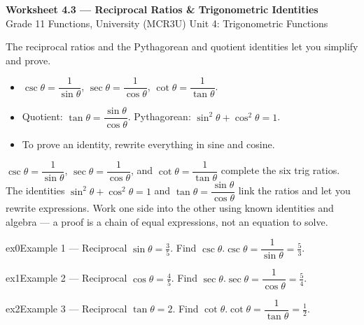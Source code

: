 \documentclass[11pt]{article}
\begin{document}
\begin{center}
{\LARGE\bfseries\color{titleblue}Worksheet 4.3 --- Reciprocal Ratios \& Trigonometric Identities}\\[2pt]
{\small Grade 11 Functions, University (MCR3U) \textperiodcentered{} Unit 4: Trigonometric Functions}
\end{center}

\begin{ideabox}
The reciprocal ratios and the Pythagorean and quotient identities let you simplify and prove.
\begin{itemize}[leftmargin=*,itemsep=2pt]
  \item $\csc\theta=\dfrac{1}{\sin\theta}$, $\sec\theta=\dfrac{1}{\cos\theta}$, $\cot\theta=\dfrac{1}{\tan\theta}$.
  \item Quotient: $\tan\theta=\dfrac{\sin\theta}{\cos\theta}$. Pythagorean: $\sin^2\theta+\cos^2\theta=1$.
  \item To prove an identity, rewrite everything in sine and cosine.
\end{itemize}
\end{ideabox}

\begin{learnbox}
$\csc\theta=\dfrac{1}{\sin\theta}$, $\sec\theta=\dfrac{1}{\cos\theta}$, and $\cot\theta=\dfrac{1}{\tan\theta}$ complete the six trig ratios.
The identities $\sin^2\theta+\cos^2\theta=1$ and $\tan\theta=\dfrac{\sin\theta}{\cos\theta}$ link the ratios and let you rewrite expressions.
Work one side into the other using known identities and algebra — a proof is a chain of equal expressions, not an equation to solve.
\end{learnbox}


\begin{example}{ex0}{Example 1 --- Reciprocal}
$\sin\theta=\tfrac35$. Find $\csc\theta$.\soln $\csc\theta=\dfrac{1}{\sin\theta}=\tfrac53$.
\end{example}

\begin{example}{ex1}{Example 2 --- Reciprocal}
$\cos\theta=\tfrac45$. Find $\sec\theta$.\soln $\sec\theta=\dfrac{1}{\cos\theta}=\tfrac54$.
\end{example}

\begin{example}{ex2}{Example 3 --- Reciprocal}
$\tan\theta=2$. Find $\cot\theta$.\soln $\cot\theta=\dfrac{1}{\tan\theta}=\tfrac12$.
\end{example}
\end{document}
